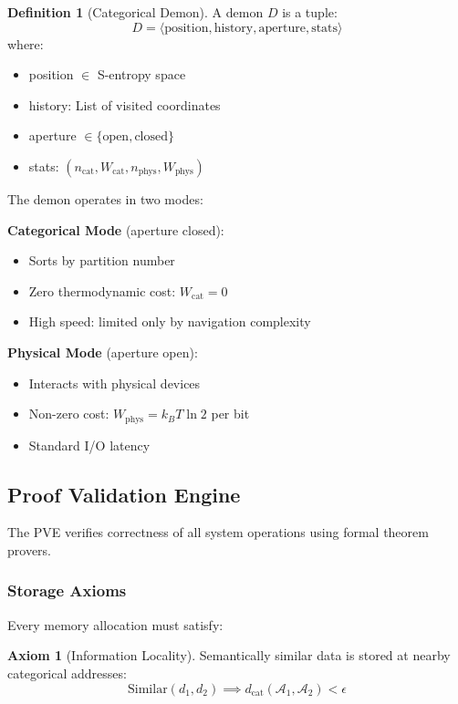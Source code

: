 \documentclass[twocolumn,10pt]{article}
\theoremstyle{definition}
\newtheorem{definition}[theorem]{Definition}
\newtheorem{axiom}[theorem]{Axiom}
\theoremstyle{remark}
\newcommand{\cataddr}{\mathcal{A}}
\newcommand{\dcat}{d_{\text{cat}}}
\begin{document}
\begin{definition}[Categorical Demon]
A demon $D$ is a tuple:
\begin{equation}
    D = \langle \text{position}, \text{history}, \text{aperture}, \text{stats} \rangle
\end{equation}
where:
\begin{itemize}
    \item position $\in$ S-entropy space
    \item history: List of visited coordinates
    \item aperture $\in \{\text{open}, \text{closed}\}$
    \item stats: $(n_{\text{cat}}, W_{\text{cat}}, n_{\text{phys}}, W_{\text{phys}})$
\end{itemize}
\end{definition}

The demon operates in two modes:

\textbf{Categorical Mode} (aperture closed):
\begin{itemize}
    \item Sorts by partition number
    \item Zero thermodynamic cost: $W_{\text{cat}} = 0$
    \item High speed: limited only by navigation complexity
\end{itemize}

\textbf{Physical Mode} (aperture open):
\begin{itemize}
    \item Interacts with physical devices
    \item Non-zero cost: $W_{\text{phys}} = k_B T \ln 2$ per bit
    \item Standard I/O latency
\end{itemize}

\subsection{Proof Validation Engine}

The PVE verifies correctness of all system operations using formal theorem provers.

\subsubsection{Storage Axioms}

Every memory allocation must satisfy:

\begin{axiom}[Information Locality]
Semantically similar data is stored at nearby categorical addresses:
\begin{equation}
    \text{Similar}(d_1, d_2) \implies \dcat(\cataddr_1, \cataddr_2) < \epsilon
\end{equation}
\end{axiom}
\end{document}
